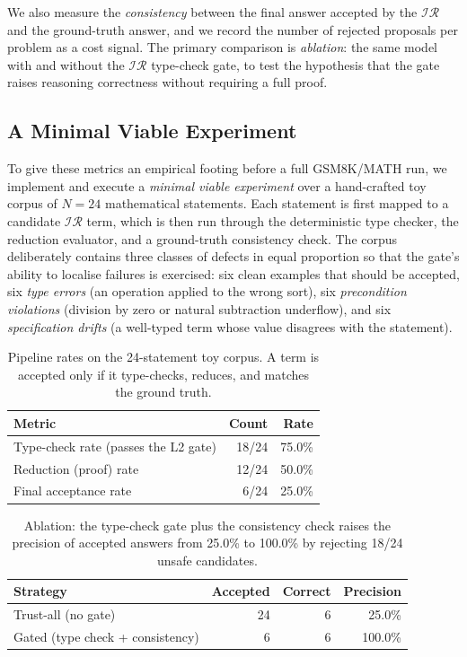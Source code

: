 \documentclass[11pt]{article}
\newcommand{\IR}{\ensuremath{\mathcal{IR}}}
\begin{document}
We also measure the \emph{consistency} between the final answer accepted by the
\IR{} and the ground-truth answer, and we record the number of rejected
proposals per problem as a cost signal. The primary comparison is
\emph{ablation}: the same model with and without the \IR{} type-check gate, to
test the hypothesis that the gate raises reasoning correctness without
requiring a full proof.

\subsection{A Minimal Viable Experiment}
\label{sec:mve}

To give these metrics an empirical footing before a full GSM8K/MATH run, we
implement and execute a \emph{minimal viable experiment} over a hand-crafted
toy corpus of $N=24$ mathematical statements. Each statement is first mapped to
a candidate \IR{} term, which is then run through the deterministic type
checker, the reduction evaluator, and a ground-truth consistency check. The
corpus deliberately contains three classes of defects in equal proportion so
that the gate's ability to localise failures is exercised: six clean examples
that should be accepted, six \emph{type errors} (an operation applied to the
wrong sort), six \emph{precondition violations} (division by zero or natural
subtraction underflow), and six \emph{specification drifts} (a well-typed term
whose value disagrees with the statement).

\begin{table}[h]
\centering
\begin{tabular}{l r r}
\toprule
Metric & Count & Rate \\
\midrule
Type-check rate (passes the L2 gate) & 18/24 & 75.0\% \\
Reduction (proof) rate & 12/24 & 50.0\% \\
Final acceptance rate & 6/24 & 25.0\% \\
\bottomrule
\end{tabular}
\caption{Pipeline rates on the 24-statement toy corpus. A term is accepted only
if it type-checks, reduces, and matches the ground truth.}
\label{tab:mve}
\end{table}

\begin{table}[h]
\centering
\begin{tabular}{l r r r}
\toprule
Strategy & Accepted & Correct & Precision \\
\midrule
Trust-all (no gate) & 24 & 6 & 25.0\% \\
Gated (type check + consistency) & 6 & 6 & 100.0\% \\
\bottomrule
\end{tabular}
\caption{Ablation: the type-check gate plus the consistency check raises the
precision of accepted answers from 25.0\% to 100.0\% by rejecting 18/24 unsafe
candidates.}
\label{tab:ablation}
\end{table}
\end{document}
